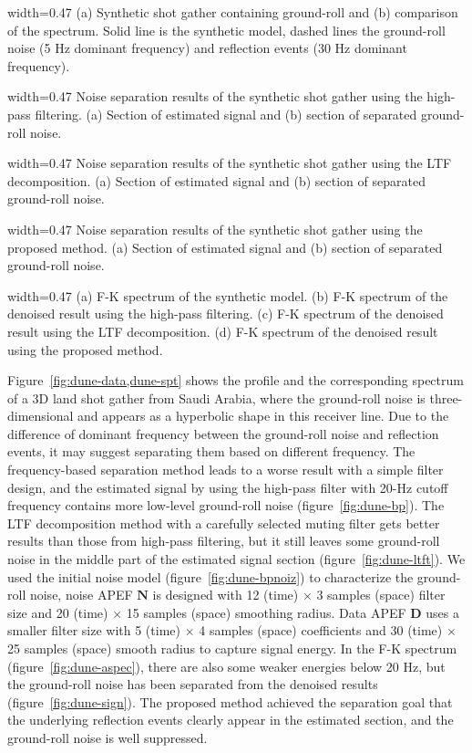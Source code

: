 {width=0.47\columnwidth}
{(a) Synthetic shot gather containing ground-roll and (b) comparison of the spectrum.
    Solid line is the synthetic model, dashed lines the ground-roll noise
    (5 Hz dominant frequency) and reflection events (30 Hz dominant frequency).}

{width=0.47\columnwidth}
{Noise separation results of the synthetic shot gather using the high-pass filtering.
    (a) Section of estimated signal and (b) section of separated ground-roll noise.}

{width=0.47\columnwidth}
{Noise separation results of the synthetic shot gather using the LTF decomposition.
    (a) Section of estimated signal and (b) section of separated ground-roll noise.}

{width=0.47\columnwidth}
{Noise separation results of the synthetic shot gather using the proposed method.
    (a) Section of estimated signal and (b) section of separated ground-roll noise.}

{width=0.47\columnwidth}
{(a) F-K spectrum of the synthetic model.
    (b) F-K spectrum of the denoised result using the high-pass filtering.
    (c) F-K spectrum of the denoised result using the LTF decomposition.
    (d) F-K spectrum of the denoised result using the proposed method.}


Figure~\ref{fig:dune-data,dune-spt} shows the profile and the corresponding
spectrum of a 3D land shot gather from Saudi Arabia, where the ground-roll
noise is three-dimensional and appears as a hyperbolic shape in this
receiver line. Due to the difference of dominant frequency between the
ground-roll noise and reflection events, it may suggest separating them
based on different frequency. The frequency-based separation method leads
to a worse result with a simple filter design, and the estimated
signal by using the high-pass filter with 20-Hz cutoff frequency
contains more low-level ground-roll noise (figure~\ref{fig:dune-bp}).
The LTF decomposition method with a carefully selected muting filter
gets better results than those from high-pass filtering, but it still
leaves some ground-roll noise in the middle part of the estimated signal
section (figure~\ref{fig:dune-ltft}). We used the initial noise model
(figure~\ref{fig:dune-bpnoiz}) to characterize the ground-roll noise,
noise APEF $\mathbf{N}$ is designed with 12 (time) $\times$ 3 samples
(space) filter size and 20 (time) $\times$ 15 samples (space) smoothing
radius. Data APEF $\mathbf{D}$ uses a smaller filter size with 5 (time)
$\times$ 4 samples (space) coefficients and 30 (time) $\times$ 25 samples
(space) smooth radius to capture signal energy. In the F-K spectrum
(figure~\ref{fig:dune-aspec}), there are also some weaker energies below 20 Hz,
but the ground-roll noise has been separated from the denoised results
(figure~\ref{fig:dune-sign}). The proposed method achieved the separation
goal that the underlying reflection events clearly appear in the estimated
section, and the ground-roll noise is well suppressed.

